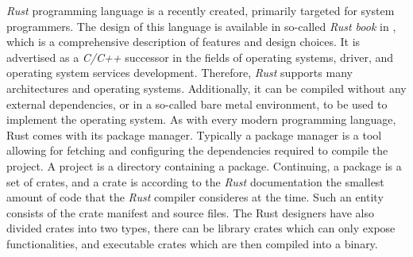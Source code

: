 \textit{Rust} programming language is a recently created, primarily targeted for system programmers. The design of this language is available in so-called \textit{Rust book} in \cite{rustbook}, which is a comprehensive description of features and design choices.  It is advertised as a \textit{C/C++} successor in the fields of operating systems, driver, and operating system services development. Therefore, \textit{Rust} supports many architectures and operating systems. Additionally, it can be compiled without any external dependencies, or in a so-called bare metal environment, to be used to implement the operating system. As with every modern programming language, Rust comes with its package manager. Typically a package manager is a tool allowing for fetching and configuring the dependencies required to compile the project. A project is a directory containing a package. Continuing, a package is a set of crates, and a crate is according to the \textit{Rust} documentation the smallest amount of code that the \textit{Rust} compiler consideres at the time. Such an entity consists of the crate manifest and source files. The Rust designers have also divided crates into two types, there can be library crates which can only expose functionalities, and executable crates which are then compiled into a binary.

